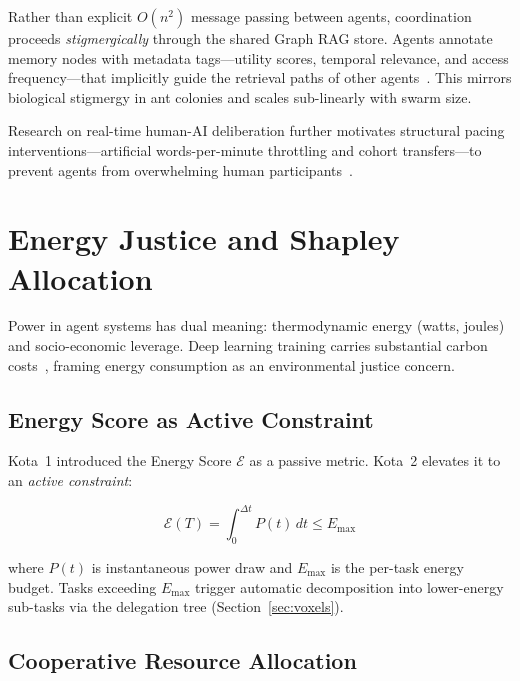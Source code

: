 \documentclass[11pt,a4paper]{article}
\begin{document}
Rather than explicit $O(n^2)$ message passing between agents, coordination proceeds \emph{stigmergically} through the shared Graph RAG store. Agents annotate memory nodes with metadata tags---utility scores, temporal relevance, and access frequency---that implicitly guide the retrieval paths of other agents~\citep{minsky1986society}. This mirrors biological stigmergy in ant colonies and scales sub-linearly with swarm size.

Research on real-time human-AI deliberation further motivates structural pacing interventions---artificial words-per-minute throttling and cohort transfers---to prevent agents from overwhelming human participants~\citep{qian2025deliberate}.

\section{Energy Justice and Shapley Allocation}
\label{sec:energy}

Power in agent systems has dual meaning: thermodynamic energy (watts, joules) and socio-economic leverage. Deep learning training carries substantial carbon costs~\citep{strubell2019energy}, framing energy consumption as an environmental justice concern.

\subsection{Energy Score as Active Constraint}

Kota~1 introduced the Energy Score $\mathcal{E}$ as a passive metric. Kota~2 elevates it to an \emph{active constraint}:

\begin{equation}
    \mathcal{E}(T) = \int_0^{\Delta t} P(t) \, dt \leq E_{\max}
    \label{eq:energy_score}
\end{equation}

\noindent where $P(t)$ is instantaneous power draw and $E_{\max}$ is the per-task energy budget. Tasks exceeding $E_{\max}$ trigger automatic decomposition into lower-energy sub-tasks via the delegation tree (Section~\ref{sec:voxels}).

\subsection{Cooperative Resource Allocation}
\end{document}
